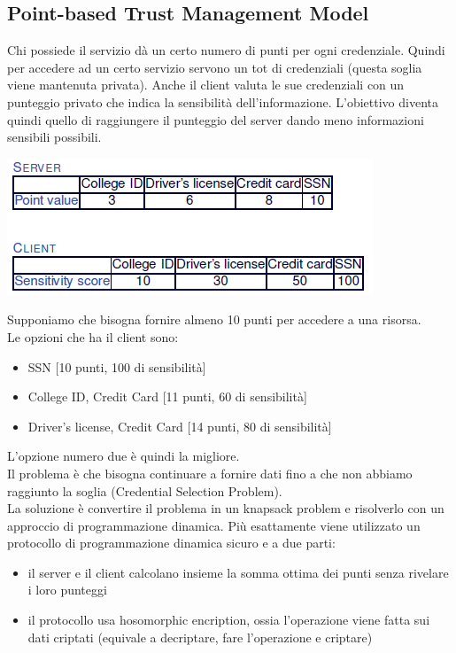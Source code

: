 \subsection{Point-based Trust Management Model}
Chi possiede il servizio dà un certo numero di punti per ogni credenziale. Quindi per accedere ad un certo servizio servono un tot di credenziali (questa soglia viene mantenuta privata). Anche il client valuta le sue credenziali con un punteggio privato che indica la sensibilità dell'informazione. L'obiettivo diventa quindi quello di raggiungere il punteggio del server dando meno informazioni sensibili possibili.\\
\begin{center}
    \includegraphics[scale=0.6]{img/pointbased.png}
\end{center}
Supponiamo che bisogna fornire almeno 10 punti per accedere a una risorsa.\\
Le opzioni che ha il client sono:
\begin{itemize}
    \item SSN [10 punti, 100 di sensibilità]
    \item College ID, Credit Card [11 punti, 60 di sensibilità]
    \item Driver's license, Credit Card [14 punti, 80 di sensibilità]
\end{itemize}
L'opzione numero due è quindi la migliore.\\
Il problema è che bisogna continuare a fornire dati fino a che non abbiamo raggiunto la soglia (Credential Selection Problem).\\
La soluzione è convertire il problema in un knapsack problem e risolverlo con un approccio di programmazione dinamica. Più esattamente viene utilizzato un protocollo di programmazione dinamica sicuro e a due parti:
\begin{itemize}
    \item il server e il client calcolano insieme la somma ottima dei punti senza rivelare i loro punteggi
    \item il protocollo usa hosomorphic encription, ossia l'operazione viene fatta sui dati criptati (equivale a decriptare, fare l'operazione e criptare)
\end{itemize}

